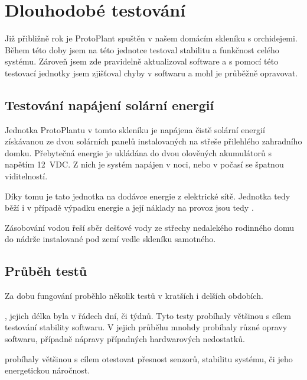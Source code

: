 \chapter{Dlouhodobé testování}
Již přibližně rok je ProtoPlant spuštěn v našem domácím skleníku s orchidejemi.
Během této doby jsem na této jednotce testoval stabilitu a funkčnost celého systému. 
Zároveň jsem zde pravidelně aktualizoval software a s pomocí této testovací jednotky jsem zjišťoval chyby v softwaru a mohl je průběžně opravovat.

\section{Testování napájení solární energií}
Jednotka ProtoPlantu v tomto skleníku je napájena čistě solární energií získávanou ze dvou solárních panelů instalovaných na střeše přilehlého zahradního domku.
Přebytečná energie je ukládána do dvou olověných akumulátorů s napětím 12~VDC.
Z nich je systém napájen v noci, nebo v počasí se špatnou viditelností.

Díky tomu je tato jednotka  na dodávce energie z elektrické sítě.
Jednotka tedy běží i v případě výpadku energie a její náklady na provoz jsou tedy .

Zásobování vodou řeší sběr dešťové vody ze střechy nedalekého rodinného domu do nádrže instalované pod zemí vedle skleníku samotného.

\section{Průběh testů}
Za dobu fungování proběhlo několik testů v kratších i delších obdobích. \newline

\noindent{}, jejich délka byla v řádech dní, či týdnů. 
Tyto testy probíhaly většinou s cílem testování stability softwaru.
V jejich průběhu mnohdy probíhaly různé opravy softwaru, případně nápravy případných hardwarových nedostatků. \newline

\noindent{} probíhaly většinou s cílem otestovat přesnost senzorů, stabilitu systému, či jeho energetickou náročnost. 

\newpage